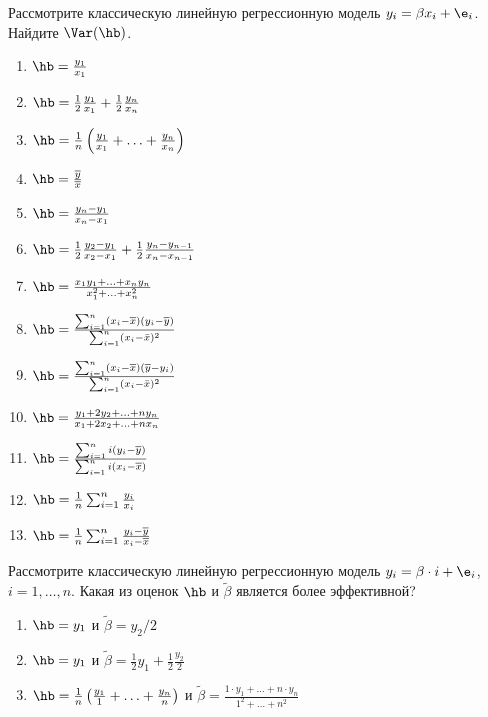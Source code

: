 \documentclass[pdftex,11pt,openany]{book}\usepackage[]{graphicx}\usepackage[]{color}
\begin{document}
\begin{solution}
\end{solution}



\begin{problem}
 Рассмотрите классическую линейную регрессионную модель $y_i = \beta x_i + \e_i$. Найдите $\Var(\hb)$.

\begin{enumerate}
\item $\hb = \frac{y_1}{x_1}$
\item $\hb = \frac{1}{2} \frac{y_1}{x_1} + \frac{1}{2} \frac{y_n}{x_n}$
\item $\hb = \frac{1}{n} \left( \frac{y_1}{x_1} + \ldots + \frac{y_n}{x_n} \right)$
\item $\hb = \frac{\overline{y}}{\overline{x}}$
\item $\hb = \frac{y_n - y_1}{x_n - x_1}$
\item $\hb = \frac{1}{2} \frac{y_2 - y_1}{x_2 - x_1} + \frac{1}{2} \frac{y_n - y_{n-1}}{x_n - x_{n-1}}$
\item $\hb = \frac{x_1 y_1 + \ldots + x_n y_n}{x_1^2 + \ldots + x_n^2}$
\item $\hb = \frac{\sum_{i=1}^n (x_i - \overline{x})(y_i - \overline{y})}{\sum_{i=1}^n (x_i - \bar{x})^2}$
\item $\hb = \frac{\sum_{i=1}^n (x_i - \overline{x})(\overline{y} - y_i)}{\sum_{i=1}^n (x_i - \bar{x})^2}$
\item $\hb = \frac{y_1 + 2 y_2 + \ldots + n y_n}{x_1 + 2 x_2 + \ldots + n x_n}$
\item $\hb = \frac{\sum_{i=1}^n i(y_i - \overline{y})}{\sum_{i=1}^n i(x_i - \overline{x})}$
\item $\hb = \frac{1}{n} \sum_{i=1}^n \frac{y_i}{x_i}$
\item $\hb = \frac{1}{n} \sum_{i=1}^n \frac{y_i - \overline{y}}{x_i - \overline{x}}$
\end{enumerate}
\end{problem}

\begin{solution}
\end{solution}



\begin{problem}
 Рассмотрите классическую линейную регрессионную модель $y_i = \beta \cdot i + \e_i$, $i=1, \ldots, n$. Какая из оценок $\hb$ и $\tilde{\beta}$ является более эффективной?

\begin{enumerate}
\item $\hb = y_1$ и $\tilde{\beta} = y_2/2$
\item $\hb = y_1$ и $\tilde{\beta} = \frac{1}{2} y_1 + \frac{1}{2} \frac{y_2}{2}$
\item $\hb = \frac{1}{n} \left(  \frac{y_1}{1} + \ldots + \frac{y_n}{n} \right) $ и $\tilde{\beta} = \frac{1 \cdot y_1 + \ldots + n \cdot y_n}{1^2 + \ldots + n^2}$
\end{enumerate}
\end{problem}
\end{document}

